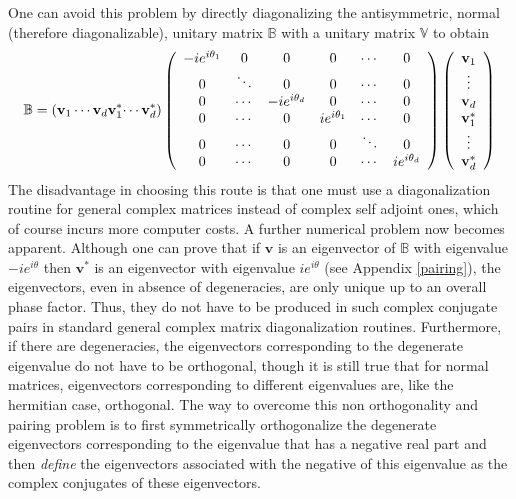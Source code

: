 \documentclass[aps,preprint]{revtex4}%
\begin{document}
One can avoid this problem by directly diagonalizing the antisymmetric, normal
\cite{Encyclo} (therefore diagonalizable), unitary matrix $\mathbb{B}$ with a
unitary matrix $\mathbb{V}$ to obtain
\begin{equation}
\mathbb{B}=\left(  \mathbf{v}_{1}\cdots\mathbf{v}_{d}\mathbf{v}_{1}^{\ast
}\mathbf{\cdots v}_{d}^{\ast}\right)  \left(
\begin{array}
[c]{cccccc}%
-ie^{i\theta_{1}} & 0 & 0 & 0 & \cdots & 0\\
0 & \ddots & 0 & 0 & \cdots & 0\\
0 & \cdots & -ie^{i\theta_{d}} & 0 & \cdots & 0\\
0 & \cdots & 0 & ie^{i\theta_{1}} & \cdots & 0\\
0 & \cdots & 0 & 0 & \ddots & 0\\
0 & \cdots & 0 & 0 & \cdots & ie^{i\theta_{d}}%
\end{array}
\right)  \left(
\begin{array}
[c]{c}%
\mathbf{v}_{1}\\
\vdots\\
\mathbf{v}_{d}\\
\mathbf{v}_{1}^{\ast}\\
\vdots\\
\mathbf{v}_{d}^{\ast}%
\end{array}
\right)
\end{equation}
The disadvantage in choosing this route is that one must use a diagonalization
routine for general complex matrices instead of complex self adjoint ones,
which of course incurs more computer costs. A further numerical problem now
becomes apparent. Although one can prove that if $\mathbf{v}$ is an
eigenvector of $\mathbb{B}$ with eigenvalue $-ie^{i\theta}$ then
$\mathbf{v}^{\ast}$ is an eigenvector with eigenvalue $ie^{i\theta}$ (see
Appendix \ref{pairing}), the eigenvectors, even in absence of degeneracies,
are only unique up to an overall phase factor. Thus, they do not have to be
produced in such complex conjugate pairs in standard general complex matrix
diagonalization routines. Furthermore, if there are degeneracies, the
eigenvectors corresponding to the degenerate eigenvalue do not have to be
orthogonal, though it is still true that for normal matrices, eigenvectors
corresponding to different eigenvalues are, like the hermitian case,
orthogonal. The way to overcome this non orthogonality and pairing problem is
to first symmetrically orthogonalize \cite{SymOrth} the degenerate
eigenvectors corresponding to the eigenvalue that has a negative real part and
then \emph{define }the eigenvectors associated with the negative of this
eigenvalue as the complex conjugates of these eigenvectors.
\end{document}
